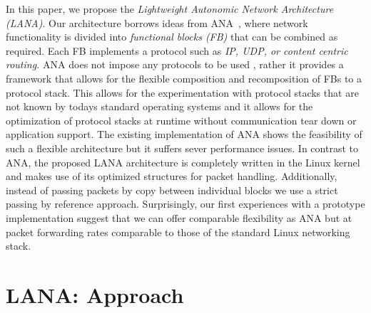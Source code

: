 \documentclass{sig-alternate}
\newcommand{\wolfgang}[1]{\textcolor{blue}{\emph{WM: #1}}}
\begin{document}
In this paper, we propose the \textit{Lightweight Autonomic Network
Architecture (LANA)}. Our architecture borrows ideas from
ANA~\cite{ANAJournal}, where network functionality is divided into
\textit{functional blocks (FB)} that can be combined as required. Each FB
implements a protocol such as \textit{IP, UDP, or content centric
routing.} ANA does not impose any protocols to be used
, rather it provides a framework that allows for the flexible
composition and recomposition of FBs to a protocol stack. This allows for the
experimentation with protocol stacks that are not known by todays standard
operating systems and it allows for the optimization of protocol stacks at
runtime without communication tear down or application support.  The existing
implementation of ANA shows the feasibility of such a flexible architecture but
it suffers sever performance issues. 
In contrast to ANA, the proposed LANA architecture is completely written in the Linux kernel and makes use of its optimized structures for packet handling. Additionally, instead of passing packets by copy between individual blocks we use a strict passing by reference approach.
Surprisingly, our first experiences with a
prototype implementation suggest that we can offer comparable %
flexibility as ANA but at packet forwarding rates comparable to those of the
standard Linux networking stack. 

\vspace{-0.2cm}
\section{LANA: Approach}



\end{document}
